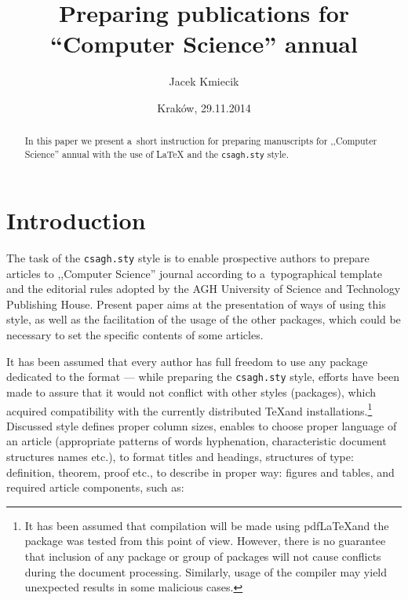 \documentclass[10pt]{article}
\begin{document}
\begin{opening}

\title{Preparing publications\newline
    for ``Computer Science'' annual}

\author[preTeXt,
         \URL{http://www.pretext.com.pl},
         e-mail: \URL{jk@pretext.com.pl}]
       {Jacek Kmiecik}

\date{Kraków, 29.11.2014}

\begin{abstract}
  In this paper we present a~short instruction for preparing
  manuscripts for ,,Computer Science'' annual with the use of
  \LaTeX{} and the \texttt{csagh.sty} style.
\end{abstract}

\end{opening}


\section{Introduction}

The task of the \texttt{csagh.sty} style
is to enable prospective authors to prepare
articles to ,,Computer Science'' journal
according to a~typographical template and the editorial rules
adopted by the AGH University of Science and Technology Publishing House.
Present paper aims at the presentation of ways of
using this style, as well as the facilitation 
of the usage of the other packages, which could be 
necessary to set the specific contents of some articles.

It has been assumed that every author has full freedom to use
any package dedicated to the \LaTeXe{} format ---
while preparing the \texttt{csagh.sty} style, efforts have been made
to assure that it would not conflict with other styles (packages),
which acquired compatibility with the currently distributed
\TeX  and \LaTeXe installations.\footnote{It has been assumed that
compilation will be made using pdf\LaTeX and the package was tested
from this point of view. However, there is no guarantee that inclusion
of any package or group of packages will not cause conflicts
during the document processing. Similarly, usage of the \XeLaTeX{} compiler
may yield unexpected results in some malicious cases.}
Discussed style defines proper column sizes, enables to choose proper
language of an article (appropriate patterns of words hyphenation,
characteristic document structures names etc.), to format titles
and headings, structures of type: definition, theorem, proof etc.,
to describe in proper way: figures and tables, 
and required article components, such as:
\end{document}

